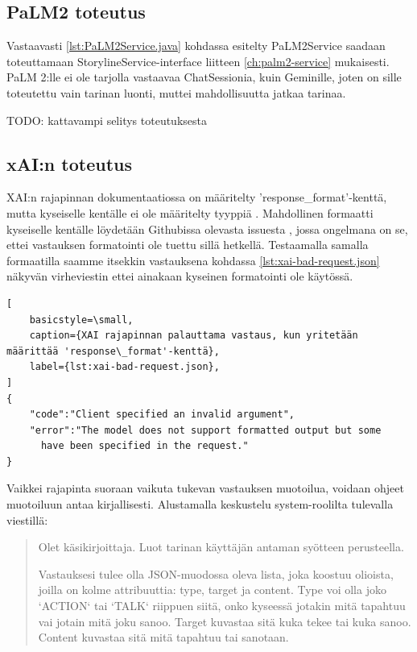 \subsection{PaLM2 toteutus}

Vastaavasti \ref{lst:PaLM2Service.java} kohdassa esitelty PaLM2Service saadaan
toteuttamaan StorylineService-interface liitteen \ref{ch:palm2-service}
mukaisesti. PaLM 2:lle ei ole tarjolla vastaavaa ChatSessionia, kuin Geminille,
joten on sille toteutettu vain tarinan luonti, muttei mahdollisuutta jatkaa
tarinaa.

TODO: kattavampi selitys toteutuksesta

\subsection{xAI:n toteutus}

XAI:n rajapinnan dokumentaatiossa on määritelty 'response\_format'-kenttä, mutta
kyseiselle kentälle ei ole määritelty tyyppiä \parencite{xAIDocsEndpoints}.
Mahdollinen formaatti kyseiselle kentälle löydetään Githubissa olevasta
issuesta \parencite{githubBerriAIlitellmIssues6610}, jossa ongelmana on se,
ettei vastauksen formatointi ole tuettu sillä hetkellä. Testaamalla samalla
formaatilla saamme itsekkin vastauksena kohdassa \ref{lst:xai-bad-request.json}
näkyvän virheviestin ettei ainakaan kyseinen formatointi ole käytössä.

\begin{lstlisting}[
    basicstyle=\small,
    caption={XAI rajapinnan palauttama vastaus, kun yritetään määrittää 'response\_format'-kenttä},
    label={lst:xai-bad-request.json},
]
{
    "code":"Client specified an invalid argument",
    "error":"The model does not support formatted output but some
      have been specified in the request."
}
\end{lstlisting}

Vaikkei rajapinta suoraan vaikuta tukevan vastauksen muotoilua, voidaan ohjeet
muotoiluun antaa kirjallisesti. Alustamalla keskustelu system-roolilta
tulevalla viestillä:

\begin{quotation}
    \noindent Olet käsikirjoittaja. Luot tarinan käyttäjän antaman syötteen
    perusteella.

    \noindent Vastauksesi tulee olla JSON-muodossa oleva lista, joka koostuu
    olioista, joilla on kolme attribuuttia: type, target ja content. Type voi
    olla joko `ACTION` tai `TALK` riippuen siitä, onko kyseessä jotakin mitä
    tapahtuu vai jotain mitä joku sanoo. Target kuvastaa sitä kuka tekee tai
    kuka sanoo. Content kuvastaa sitä mitä tapahtuu tai sanotaan.
\end{quotation}


